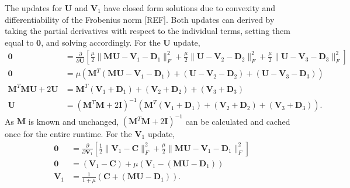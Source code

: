 The updates for $\mathbf{U}$ and $\mathbf{V}_1$ have closed form solutions due to convexity and differentiability of the Frobenius norm [REF]. Both updates can derived by taking the partial derivatives with respect to the individual terms, setting them equal to $\mathbf{0}$, and solving accordingly. For the $\mathbf{U}$ update,
\begin{equation*}
  \begin{aligned}
    \mathbf{0} &= \frac{\partial}{\partial \mathbf{U}}\left[\frac{\mu}{2} \|\mathbf{MU} - \mathbf{V}_1 - \mathbf{D}_1\|_F^2  + \frac{\mu}{2} \|\mathbf{U} - \mathbf{V}_2 - \mathbf{D}_2\|_F^2  + \frac{\mu}{2} \|\mathbf{U} - \mathbf{V}_3 - \mathbf{D}_3\|_F^2\right]
    \\
    \mathbf{0} &= \mu \left(\mathbf{M}^T(\mathbf{MU}-\mathbf{V}_1-\mathbf{D}_1) + (\mathbf{U}-\mathbf{V}_2-\mathbf{D}_2) + (\mathbf{U}-\mathbf{V}_3-\mathbf{D}_3)\right)
    \\
    \mathbf{M}^T\mathbf{MU} + 2\mathbf{U} &= \mathbf{M}^T(\mathbf{V}_1+\mathbf{D}_1) + (\mathbf{V}_2+\mathbf{D}_2) + (\mathbf{V}_3+\mathbf{D}_3)
    \\
    \mathbf{U} &= (\mathbf{M}^T \mathbf{M} + 2\mathbf{I})^{-1}(\mathbf{M}^T(\mathbf{V}_1+\mathbf{D}_1) + (\mathbf{V}_2+\mathbf{D}_2) + (\mathbf{V}_3+\mathbf{D}_3)).
  \end{aligned}
\end{equation*}
As $\mathbf{M}$ is known and unchanged, $(\mathbf{M}^T \mathbf{M} + 2\mathbf{I})^{-1}$ can be calculated and cached once for the entire runtime. For the $\mathbf{V}_1$ update,
$$
\begin{aligned}
   \mathbf{0} &= \frac{\partial}{\partial \mathbf{V}_1} \left[ \frac{1}{2}\|\mathbf{V}_1-\mathbf{C}\|_F^2 + \frac{\mu}{2} \|\mathbf{MU} - \mathbf{V}_1 - \mathbf{D}_1 \|_F^2 \right]
  \\
  \mathbf{0} &= (\mathbf{V}_1 - \mathbf{C}) + \mu(\mathbf{V}_1 - (\mathbf{MU} - \mathbf{D}_1))
  \\
  \mathbf{V}_1 &= \frac{1}{1+\mu} \left(\mathbf{C} + (\mathbf{MU} - \mathbf{D}_1)\right).
\end{aligned}
$$

